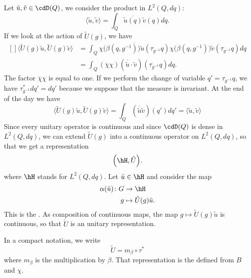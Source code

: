 Let $\tilde u,\tilde v\in\cdD(Q)$, we consider the product in $L^2(Q,dq)$:
\begin{equation}
	\langle \tilde u, \tilde v\rangle =\int_Q\overline{\tilde u(q)}\tilde v(q)dq.
\end{equation}
If we look at the action of $\tilde U(g)$, we have
\begin{equation}
	\begin{aligned}[]
		\langle \tilde U(g)\tilde u, \tilde U(g)\tilde v\rangle &=\int_Q\overline{ \chi\big( \beta(q,g^{-1}) \big)\tilde u(\tau_{g^{-1}}q) }\chi\big( \beta(q,g^{-1}) \big)\tilde v(\tau_{g^{-1}}q)dq\\
		&=\int_Q(\overline{ \chi }\chi)(\overline{ \tilde u }\cdot \tilde v)(\tau_{g^{-1}}q)dq.
	\end{aligned}
\end{equation}
The factor $\overline{ \chi }\chi$ is equal to one. If we perform the change of variable $q'=\tau_{g^{-1}}q$, we have $\tau_{g^{-1}}^*dq'=dq'$ because we suppose that the measure is invariant. At the end of the day we have
\begin{equation}
	\langle \tilde U(g)\tilde u, \tilde U(g)\tilde v\rangle =\int_Q(\overline{ \tilde u }\tilde v)(q')dq'=\langle \tilde u, \tilde v\rangle
\end{equation}
Since every unitary operator is continuous and since $\cdD(Q)$ is dense in $L^2(Q,dq)$, we can extend $\tilde U(g)$ into a continuous operator on $L^2(Q,dq)$, so that we get a representation
\begin{equation}
	\Big( \hH,\tilde U \Big).
\end{equation}
where $\hH$ stands for $L^2(Q,dq)$. Let $\tilde u\in\hH$ and consider the map
\begin{equation}
	\begin{aligned}
		\alpha(\tilde u)\colon G&\to \hH \\
		g&\mapsto \tilde U(g)\tilde u.
	\end{aligned}
\end{equation}
This is the . As composition of continuous maps, the map $g\mapsto \tilde U(g)\tilde u$ is continuous, so that $\tilde U$ is an unitary representation.

In a compact notation, we write
\begin{equation}
	\tilde U=m_{\beta}\circ\tau^*
\end{equation}
where $m_{\beta}$ is the multiplication by $\beta$. That representation is the  defined from $B$ and $\chi$.
